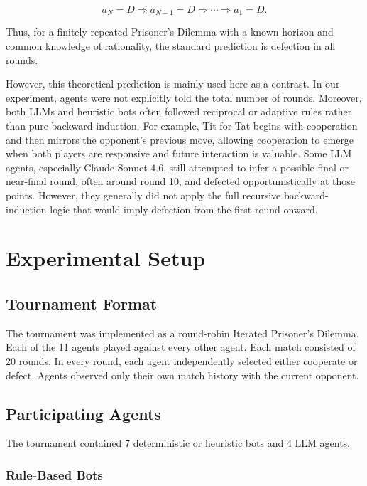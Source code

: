 \documentclass[11pt]{article}
\begin{document}
\[
a_N = D \Rightarrow a_{N-1} = D \Rightarrow \cdots \Rightarrow a_1 = D.
\]

Thus, for a finitely repeated Prisoner's Dilemma with a known horizon and common knowledge of rationality, the standard prediction is defection in all rounds.

However, this theoretical prediction is mainly used here as a contrast. In our experiment, agents were not explicitly told the total number of rounds. Moreover, both LLMs and heuristic bots often followed reciprocal or adaptive rules rather than pure backward induction. For example, Tit-for-Tat begins with cooperation and then mirrors the opponent's previous move, allowing cooperation to emerge when both players are responsive and future interaction is valuable. Some LLM agents, especially Claude Sonnet 4.6, still attempted to infer a possible final or near-final round, often around round 10, and defected opportunistically at those points. However, they generally did not apply the full recursive backward-induction logic that would imply defection from the first round onward.




\section{Experimental Setup}

\subsection{Tournament Format}

The tournament was implemented as a round-robin Iterated Prisoner's Dilemma. Each of the 11 agents played against every other agent. Each match consisted of 20 rounds. In every round, each agent independently selected either cooperate or defect. Agents observed only their own match history with the current opponent.

\subsection{Participating Agents}

The tournament contained 7 deterministic or heuristic bots and 4 LLM agents.

\subsubsection{Rule-Based Bots}
\end{document}

